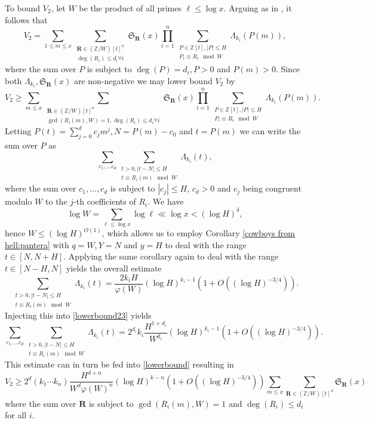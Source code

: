 \documentclass[reqno, 11pt]{amsart}
\numberwithin{equation}{section}
\theoremstyle{definition}
\renewcommand{\phi}{\varphi}
\newcommand{\0}{\mathbf{0}}
\renewcommand{\leq}{\leqslant}
\renewcommand{\geq}{\geqslant}
\renewcommand{\b}{\mathbf{b}}
\renewcommand{\b}{\mathbf}
\renewcommand{\leq}{\leqslant}
\renewcommand{\geq}{\geqslant}
\renewcommand{\#}{\sharp}
\begin{document}
To bound $V_2$, let $W$ be the product of all primes $\ell \leq \log x$. Arguing as in \cite[Equation (4.8)]{MR4542704}, it follows that 
 $$V_2=\sum_{1\leq m\leq x }  \sum_{\substack{ \mathbf  R \in (\mathbb Z/W)[t]^n\\ \deg(R_i)\leq d_i \forall i  }} 
 \mathfrak S_{\mathbf R }(x)  \prod_{i=1}^n  \sum_{\substack{P \in  \mathbb Z[t],|P|\leq H
\\  P_i \equiv R_i \mod W }}  \Lambda_{k_i}(P(m))  ,$$ where  the sum over $P$ is subject to  
$\deg(P)=d_i, P>0$ and $P(m)>0$. Since both  $\Lambda_{k_i} , \mathfrak S_{\b R }(x)$ are non-negative we may
lower bound $V_2$ by  \begin{equation}\label{lowerbound} V_2\geq \sum_{  m\leq x }
 \sum_{\substack{ \mathbf R \in (\mathbb Z/W)[t]^n\\ \gcd(R_i(m),W)=1,  \deg(R_i)\leq d_i \forall i  }} \mathfrak S_{\mathbf R }(x)
 \prod_{i=1}^n  \sum_{\substack{P \in  \mathbb Z[t],|P|\leq H \\  P_i \equiv R_i \mod W }}  \Lambda_{k_i}(P(m)).\end{equation} 
Letting  $P(t)=\sum_{j=0}^d c_j m^j,  N=P(m)-c_0$ and $t=P(m)$ we can  write the  sum over $P$ as 
\begin{equation}\label{lowerbound23} \sum_{c_1,\ldots c_d} \sum_{\substack{t>0,|t-N|\leq H\\  t \equiv R_i(m) \mod W }} 
\Lambda_{k_i}(t ), \end{equation}where the sum over $c_1,\ldots, c_d$ is subject to $|c_j|\leq H$, $ c_d>0$ and   $c_j$ being congruent modulo $W$ to the $j$-th coefficients of $R_i$. We have   $$ \log W =\sum_{\ell\leq \log x }\log \ell \ll \log x < (\log H)^\delta, $$ hence $W\leq (\log H)^{O(1)}$, which allows us to  employ Corollary \ref{cowboys from hell:pantera} with 
$q=W,Y=N $ and $y=H$ to deal with the range $t \in [N,N+H]$.  Applying the same corollary again to deal with the 
range $t \in [N-H,N]$ yields the overall estimate  $$ \sum_{\substack{t>0,|t-N|\leq H\\  t \equiv R_i(m) \mod W }} 
\Lambda_{k_i}(t )= \frac{2k_i H}{\phi(W)} (\log H)^{k_i-1} (1+O( (\log H)^{-3/4})).$$ Injecting this into  \eqref{lowerbound23} yields 
$$\sum_{c_1,\ldots c_d} \sum_{\substack{t>0,|t-N|\leq H \\  t \equiv R_i(m) \mod W }} 
\Lambda_{k_i}(t ) =2^{d_i} k_i \frac{H^{1+d_i}}{W^{d_i}}  (\log H)^{k_i-1} (1+O( (\log H)^{-3/4})).$$
This estimate can in turn be fed into \eqref{lowerbound}  resulting in  $$
V_2\geq  2^d (k_1\cdots k_n) \frac{H^{d+n}}{W^d \phi(W)^n}  ( \log H)^{k-n} 
(1+O( (\log H)^{-3/4}))\sum_{  m\leq x }  \sum_{\mathbf R \in (\mathbb Z/W)[t]^n  } \mathfrak S_{\mathbf R }(x)
$$ where the sum over $\b R$ is subject to  $\gcd(R_i(m),W)=1$ and  $ \deg(R_i)\leq d_i$ for all $i$. 
\end{document}
